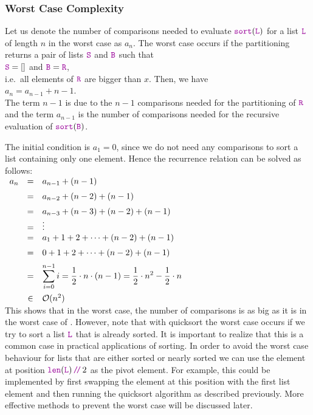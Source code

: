\subsubsection{Worst Case Complexity}
Let us denote the number of comparisons needed to evaluate $\mytt{sort}(\mytt{L})$ for a list $\mytt{L}$ of
length $n$ in the worst case as $a_n$.  The worst case occurs if the partitioning
returns a pair of lists $\mytt{S}$ and $\mytt{B}$ such that
\\[0.2cm]
\hspace*{1.3cm}
$\mytt{S} = []$ \quad and \quad $\mytt{B} = \mytt{R}$,
\\[0.2cm]
i.e.~all elements of $\mytt{R}$ are bigger than $x$.  Then, we have
\\[0.2cm]
\hspace*{1.3cm}
$a_n = a_{n-1} + n - 1$. 
\\[0.2cm]
The term $n-1$ is due to the $n-1$ comparisons needed for the partitioning of $\mytt{R}$
and the term $a_{n-1}$ is the number of comparisons needed for the recursive evaluation of $\mytt{sort}(\mytt{B})$.

The initial condition is $a_1 = 0$, since we do not need any comparisons to sort a list
containing only one element.
Hence the recurrence relation can be solved as follows:
\\[0.2cm]
\hspace*{1.3cm}
$
\begin{array}{lcl}
  a_n & = & a_{n-1} + (n-1) \\[0.2cm]
      & = & a_{n-2} + (n-2) + (n-1) \\[0.2cm]
      & = & a_{n-3} + (n-3) + (n-2) + (n-1) \\
      & = & \vdots \\
      & = & a_{1} + 1 + 2 + \cdots  + (n-2) + (n-1) \\[0.2cm]
      & = & 0 + 1 + 2 + \cdots  + (n-2) + (n-1) \\[0.2cm]
      & = & \displaystyle \sum\limits_{i=0}^{n-1} i  =  \frac{1}{2} \cdot n \cdot(n - 1) =
            \frac{1}{2} \cdot n^2 - \frac{1}{2} \cdot n \\[0.5cm]
      & \in & \mathcal{O}(n^2)
\end{array}
$
\\[0.2cm]
This shows that in the worst case, the number of comparisons is as big as it is in the worst case of 
.  However, note that with quicksort the worst case occurs if we try to sort a list
$\mytt{L}$ that is already sorted.  It is important to realize that this is a common case in practical
applications of sorting.  In order to avoid the worst case behaviour for lists that are either sorted or nearly
sorted we can use the element at position $\mytt{len}(\mytt{L})\dv 2$ as the pivot element.  For example, this
could be implemented by first swapping the element at this position with the first list element and then
running the quicksort algorithm as described previously.  More effective methods to prevent the worst case will
be discussed later.



